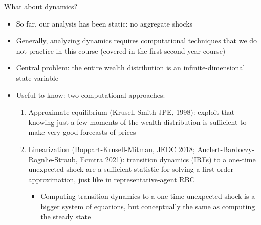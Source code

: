 \documentclass[9pt]{beamer}
\newcommand{\bit}{\begin{itemize}}
\newcommand{\eit}{\end{itemize}}
\newcommand{\ben}{\begin{enumerate}}
\newcommand{\een}{\end{enumerate}}
\begin{document}
\begin{frame}{What about dynamics?}
\bit
\setlength\itemsep{1.5em}

\item So far, our analysis has been static: no aggregate shocks


\item Generally, analyzing dynamics requires computational techniques that we do not practice in this course (covered in the first second-year course)


\item Central problem: the entire wealth distribution is an infinite-dimensional state variable

\item Useful to know: two computational approaches:
\ben
\setlength\itemsep{1em}

\item Approximate equilibrium (Krusell-Smith JPE, 1998): exploit that knowing just a few moments of the wealth distribution is sufficient to make very good forecasts of prices

\item Linearization (Boppart-Krusell-Mitman, JEDC 2018; Auclert-Bardoczy-Rognlie-Straub, Ecmtra 2021): transition dynamics (IRFs) to a one-time unexpected shock are a sufficient statistic for solving a first-order approximation, just like in representative-agent RBC
\bit
	\item Computing transition dynamics to a one-time unexpected shock is a bigger system of equations, but conceptually the same as computing the steady state 
	
\eit

\een

\eit

\end{frame}
\end{document}
